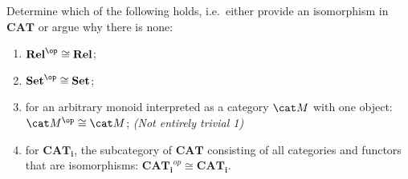 \begin{exercise}
  Determine which of the following holds, i.e.\ either provide an isomorphism in $\mathbf{CAT}$ or argue why there is none:

  \begin{enumerate}
  \item $\mathbf {Rel}^{\op}\cong \mathbf {Rel}$;
  \item $\mathbf {Set}^{\op}\cong \mathbf {Set}$;
  \item for an arbitrary monoid interpreted as a category $\M$ with one object:  $\M^{\op}\cong \M$; \textit{(Not entirely trivial 1)}
  \item for $\mathbf{CAT_i}$, the subcategory of $\mathbf{CAT}$ consisting of all categories and functors that are isomorphisms: $\mathbf{CAT_i}^{op}\cong\mathbf{CAT_i}$.
  \end{enumerate}

\end{exercise}

